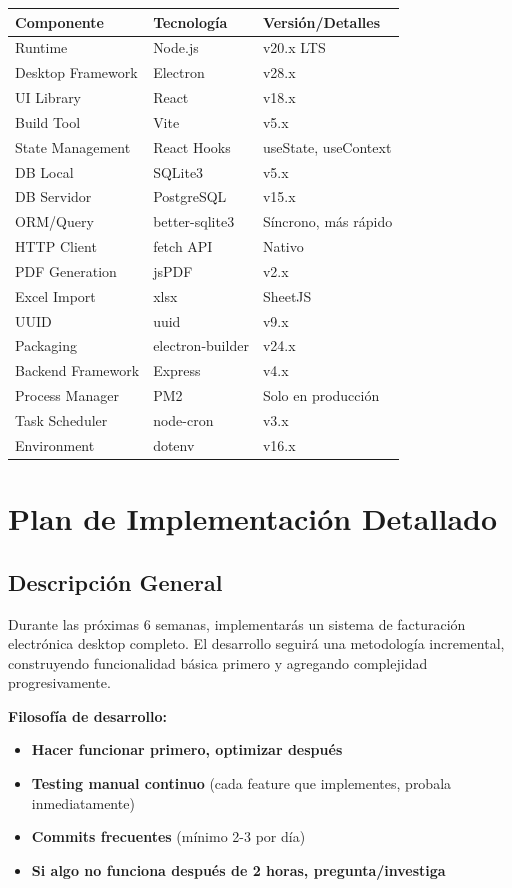 \documentclass[11pt,a4paper]{article}
\begin{document}
\begin{table}[h]
\centering
\small
\begin{tabular}{|l|l|p{5cm}|}
\hline
\textbf{Componente} & \textbf{Tecnología} & \textbf{Versión/Detalles} \\ \hline
Runtime & Node.js & v20.x LTS \\
Desktop Framework & Electron & v28.x \\
UI Library & React & v18.x \\
Build Tool & Vite & v5.x \\
State Management & React Hooks & useState, useContext \\
DB Local & SQLite3 & v5.x \\
DB Servidor & PostgreSQL & v15.x \\
ORM/Query & better-sqlite3 & Síncrono, más rápido \\
HTTP Client & fetch API & Nativo \\
PDF Generation & jsPDF & v2.x \\
Excel Import & xlsx & SheetJS \\
UUID & uuid & v9.x \\
Packaging & electron-builder & v24.x \\
Backend Framework & Express & v4.x \\
Process Manager & PM2 & Solo en producción \\
Task Scheduler & node-cron & v3.x \\
Environment & dotenv & v16.x \\
\hline
\end{tabular}
\end{table}

\section{Plan de Implementación Detallado}

\subsection{Descripción General}

Durante las próximas 6 semanas, implementarás un sistema de facturación electrónica desktop completo. El desarrollo seguirá una metodología incremental, construyendo funcionalidad básica primero y agregando complejidad progresivamente.

\textbf{Filosofía de desarrollo:}
\begin{itemize}
    \item \textbf{Hacer funcionar primero, optimizar después}
    \item \textbf{Testing manual continuo} (cada feature que implementes, probala inmediatamente)
    \item \textbf{Commits frecuentes} (mínimo 2-3 por día)
    \item \textbf{Si algo no funciona después de 2 horas, pregunta/investiga}
\end{itemize}
\end{document}
